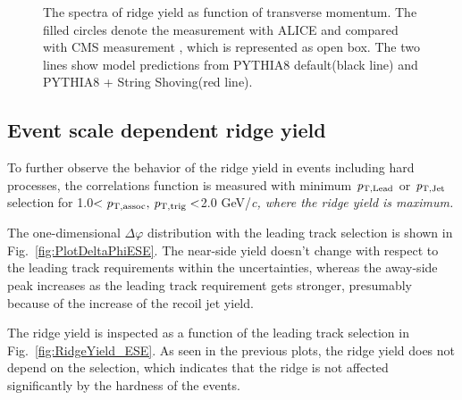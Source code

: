 \begin{figure}[h!]
	\centering
	\caption{ The spectra of ridge yield as function of transverse momentum. The filled circles denote the measurement with ALICE and compared with CMS measurement \cite{ridge_pp_1}, which is represented as open box. The two lines show model predictions from PYTHIA8 default(black line) and PYTHIA8 + String Shoving(red line). }
	\label{fig:PlotYSpect}
\end{figure}

\subsection{Event scale dependent ridge yield}

To further observe the behavior of the ridge yield in events including hard processes, the correlations function is measured with minimum $\it{p}_{\rm{T, Lead}}$ or $\it{p}_{\rm{T, Jet}}$ selection for 1.0$<\it{p}_{\rm{T, assoc}},\,\it{p}_{\rm{T, trig}}<$2.0 GeV/\it{c}\rm{}, where the ridge yield is maximum. 

The one-dimensional $\Delta\varphi$ distribution with the leading track selection is shown in Fig.~\ref{fig:PlotDeltaPhiESE}. The near-side yield doesn't change with respect to the leading track requirements within the uncertainties, whereas the away-side peak increases as the leading track requirement gets stronger, presumably because of the increase of the recoil jet yield.

The ridge yield is inspected as a function of the leading track selection in Fig.~\ref{fig:RidgeYield_ESE}. As seen in the previous plots, the ridge yield does not depend on the selection, which indicates that the ridge is not affected significantly by the hardness of the events.


